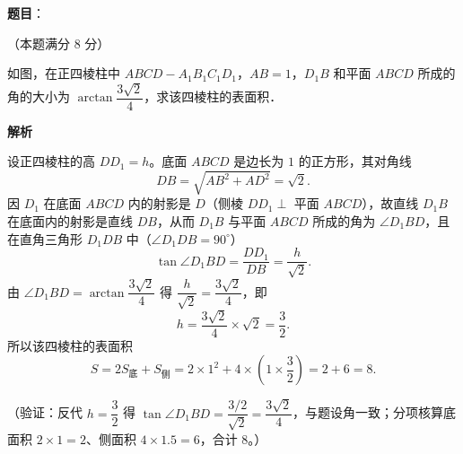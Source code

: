 \begin{answer}

\textbf{题目}：

（本题满分 8 分）

如图，在正四棱柱中 \(ABCD-A_{1}B_{1}C_{1}D_{1}\)，\(AB=1\)，\(D_{1}B\) 和平面 \(ABCD\) 所成的角的大小为 \(\arctan\dfrac{3\sqrt{2}}{4}\)，求该四棱柱的表面积．
\nopagebreak[4]
\begin{center}\end{center}
\nopagebreak[4]
\textbf{解析}

设正四棱柱的高 \(DD_{1}=h\)。底面 \(ABCD\) 是边长为 \(1\) 的正方形，其对角线
\nopagebreak[4]
\[
DB=\sqrt{AB^{2}+AD^{2}}=\sqrt{2}.
\]
因 \(D_{1}\) 在底面 \(ABCD\) 内的射影是 \(D\)（侧棱 \(DD_{1}\perp\) 平面 \(ABCD\)），故直线 \(D_{1}B\) 在底面内的射影是直线 \(DB\)，从而 \(D_{1}B\) 与平面 \(ABCD\) 所成的角为 \(\angle D_{1}BD\)，且在直角三角形 \(D_{1}DB\) 中（\(\angle D_{1}DB=90^{\circ}\)）
\nopagebreak[4]
\[
\tan\angle D_{1}BD=\frac{DD_{1}}{DB}=\frac{h}{\sqrt{2}}.
\]
由 \(\angle D_{1}BD=\arctan\dfrac{3\sqrt{2}}{4}\) 得 \(\dfrac{h}{\sqrt{2}}=\dfrac{3\sqrt{2}}{4}\)，即
\nopagebreak[4]
\[
h=\frac{3\sqrt{2}}{4}\times\sqrt{2}=\frac{3}{2}.
\]
所以该四棱柱的表面积
\nopagebreak[4]
\[
S=2S_{\text{底}}+S_{\text{侧}}=2\times1^{2}+4\times\left(1\times\frac{3}{2}\right)=2+6=8.
\]

（验证：反代 \(h=\dfrac{3}{2}\) 得 \(\tan\angle D_{1}BD=\dfrac{3/2}{\sqrt{2}}=\dfrac{3\sqrt{2}}{4}\)，与题设角一致；分项核算底面积 \(2\times1=2\)、侧面积 \(4\times1.5=6\)，合计 \(8\)。）


\end{answer}
